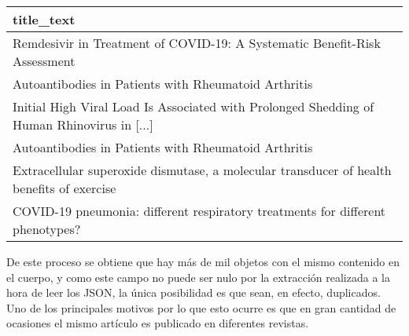 \documentclass[10pt, a4paper]{article}
\begin{document}
\begin{tabular}{l}
 title\_text\\
\hline
	 Remdesivir in Treatment of COVID-19: A Systematic Benefit-Risk Assessment                                                               \\
	 Autoantibodies in Patients with Rheumatoid Arthritis                                                                                    \\
	 Initial High Viral Load Is Associated with Prolonged Shedding of Human Rhinovirus in [...]                                              \\
	 Autoantibodies in Patients with Rheumatoid Arthritis                                                                                    \\
	 Extracellular superoxide dismutase, a molecular transducer of health benefits of exercise                                               \\
	 COVID-19 pneumonia: different respiratory treatments for different phenotypes?                                                          \\
\end{tabular}


De este proceso se obtiene que hay más de mil objetos con el mismo contenido en el cuerpo, y como este campo no puede ser nulo por la extracción realizada a la hora de leer los JSON, la única posibilidad es que sean, en efecto, duplicados. Uno de los principales motivos por lo que esto ocurre es que en gran cantidad de ocasiones el mismo artículo es publicado en diferentes revistas.
\end{document}
